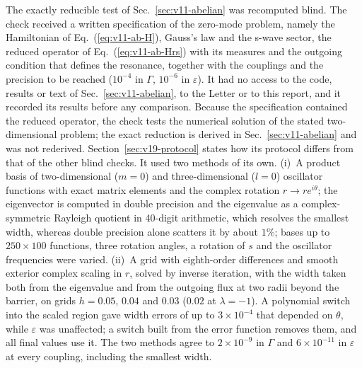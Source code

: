 The exactly reducible test of Sec.~\ref{sec:v11-abelian} was recomputed blind.
The check received a written specification of the zero-mode problem, namely the Hamiltonian of Eq.~(\ref{eq:v11-ab-H}), Gauss's law and the s-wave sector, the reduced operator of Eq.~(\ref{eq:v11-ab-Hrs}) with its measures and the outgoing condition that defines the resonance, together with the couplings and the precision to be reached ($10^{-4}$ in $\Gamma$, $10^{-6}$ in $\varepsilon$). %
It had no access to the code, results or text of Sec.~\ref{sec:v11-abelian}, to the Letter or to this report, and it recorded its results before any comparison.
Because the specification contained the reduced operator, the check tests the numerical solution of the stated two-dimensional problem; the exact reduction is derived in Sec.~\ref{sec:v11-abelian} and was not rederived.
Section~\ref{sec:v19-protocol} states how its protocol differs from that of the other blind checks.
It used two methods of its own.
(i)~A product basis of two-dimensional ($m=0$) and three-dimensional ($l=0$) oscillator functions with exact matrix elements and the complex rotation $r\to re^{i\theta}$; the eigenvector is computed in double precision and the eigenvalue as a complex-symmetric Rayleigh quotient in 40-digit arithmetic, which resolves the smallest width, whereas double precision alone scatters it by about $1\%$; bases up to $250\times100$ functions, three rotation angles, a rotation of $s$ and the oscillator frequencies were varied. %
(ii)~A grid with eighth-order differences and smooth exterior complex scaling in $r$, solved by inverse iteration, with the width taken both from the eigenvalue and from the outgoing flux at two radii beyond the barrier, on grids $h=0.05$, $0.04$ and $0.03$ ($0.02$ at $\lambda=-1$). %
A polynomial switch into the scaled region gave width errors of up to $3\times10^{-4}$ that depended on $\theta$, while $\varepsilon$ was unaffected; a switch built from the error function removes them, and all final values use it. %
The two methods agree to $2\times10^{-9}$ in $\Gamma$ and $6\times10^{-11}$ in $\varepsilon$ at every coupling, including the smallest width. %

